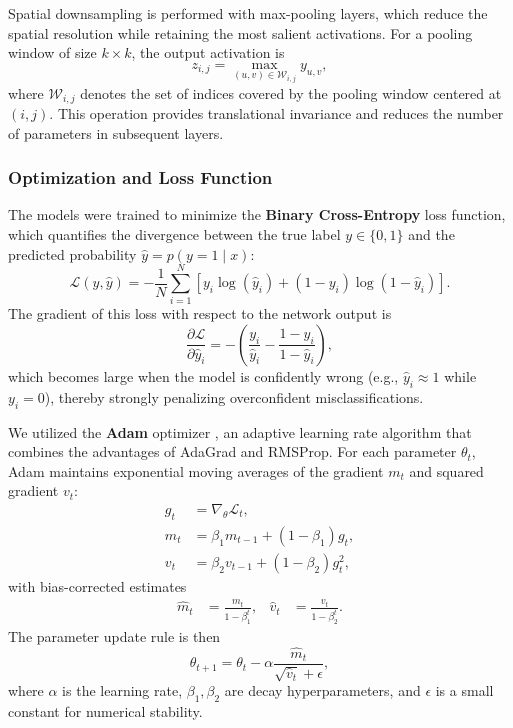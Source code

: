 \documentclass[12pt,a4paper]{article}
\begin{document}
Spatial downsampling is performed with max-pooling layers, which reduce the spatial resolution while retaining the most salient activations. For a pooling window of size $k \times k$, the output activation is
\begin{equation}
    z_{i,j} = \max_{(u,v) \in \mathcal{W}_{i,j}} y_{u,v},
\end{equation}
where $\mathcal{W}_{i,j}$ denotes the set of indices covered by the pooling window centered at $(i,j)$. This operation provides translational invariance and reduces the number of parameters in subsequent layers.
\subsubsection{Optimization and Loss Function}
The models were trained to minimize the \textbf{Binary Cross-Entropy} loss function, which quantifies the divergence between the true label $y \in \{0, 1\}$ and the predicted probability $\hat{y} = p(y=1 \mid x)$:
\begin{equation}
    \mathcal{L}(y, \hat{y}) = -\frac{1}{N} \sum_{i=1}^{N} \left[ y_i \log(\hat{y}_i) + (1 - y_i) \log(1 - \hat{y}_i) \right].
\end{equation}
The gradient of this loss with respect to the network output is
\begin{equation}
    \frac{\partial \mathcal{L}}{\partial \hat{y}_i} = -\left(\frac{y_i}{\hat{y}_i} - \frac{1-y_i}{1-\hat{y}_i} \right),
\end{equation}
which becomes large when the model is confidently wrong (e.g., $\hat{y}_i \approx 1$ while $y_i = 0$), thereby strongly penalizing overconfident misclassifications.

We utilized the \textbf{Adam} optimizer \citep{kingma2017adammethodstochasticoptimization}, an adaptive learning rate algorithm that combines the advantages of AdaGrad and RMSProp. For each parameter $\theta_t$, Adam maintains exponential moving averages of the gradient $m_t$ and squared gradient $v_t$:
\begin{align}
    g_t &= \nabla_\theta \mathcal{L}_t, \\
    m_t &= \beta_1 m_{t-1} + (1-\beta_1) g_t, \\
    v_t &= \beta_2 v_{t-1} + (1-\beta_2) g_t^2,
\end{align}
with bias-corrected estimates
\begin{align}
    \hat{m}_t &= \frac{m_t}{1-\beta_1^t}, &
    \hat{v}_t &= \frac{v_t}{1-\beta_2^t}.
\end{align}
The parameter update rule is then
\begin{equation}
    \theta_{t+1} = \theta_t - \alpha \frac{\hat{m}_t}{\sqrt{\hat{v}_t} + \epsilon},
\end{equation}
where $\alpha$ is the learning rate, $\beta_1, \beta_2$ are decay hyperparameters, and $\epsilon$ is a small constant for numerical stability.
\end{document}
